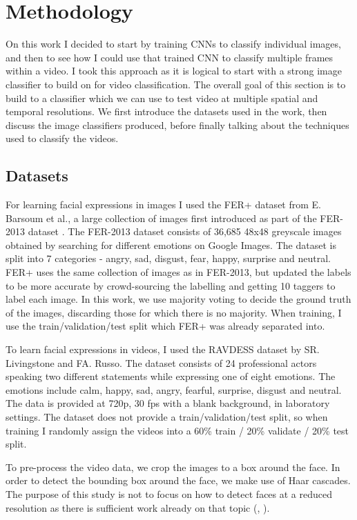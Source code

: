 \documentclass[sigconf]{acmart}
\begin{document}
{\section{Methodology}
On this work I decided to start by training CNNs to classify individual
images, and then to see how I could use that trained CNN to classify multiple
frames within a video. I took this approach as it is logical to start with a
strong image classifier to build on for video classification.
The overall goal of this section is to build to a classifier which we can use to test
video at multiple spatial and temporal resolutions. We first introduce the
datasets used in the work, then discuss the image classifiers produced, before
finally talking about the techniques used to classify the videos.

\subsection{Datasets}

For learning facial expressions in images I used the FER+ dataset
\cite{barsoum2016training} from E. Barsoum et al., a large collection of
images first introduced as part of the FER-2013 dataset \cite{goodfellow2013challenges}.
The FER-2013 dataset consists of 36,685 48x48 greyscale images obtained
by searching for different emotions on Google Images. The dataset is split
into 7 categories - angry, sad, disgust, fear, happy, surprise and neutral.
FER+ uses the same collection of images as in FER-2013, but updated the labels
to be more accurate by crowd-sourcing the labelling and getting 10 taggers to
label each image. In this work, we use majority voting to decide the ground
truth of the images, discarding those for which there is no majority. When
training, I use the train/validation/test split which FER+ was already
separated into.

To learn facial expressions in videos, I used the RAVDESS
\cite{livingstone2018ryerson} dataset by SR. Livingstone and FA. Russo. The
dataset consists of 24 professional actors speaking two different statements
while expressing one of eight emotions. The emotions include calm, happy, sad,
angry, fearful, surprise, disgust and neutral. The data is provided at 720p,
30 fps with a blank background, in laboratory settings. The dataset does not
provide 
a train/validation/test split, so when training I randomly
assign the videos into a 60\% train / 20\% validate / 20\% test split.

To pre-process the video data, we crop the images to a box around the face. In
order to detect the bounding box around the face, we make use of Haar
cascades. The purpose of this study is not to focus on how to detect faces at
a reduced resolution as there is sufficient work already on that topic
(\cite{zheng2010face}, \cite{tian2004evaluation}).

}
\end{document}
